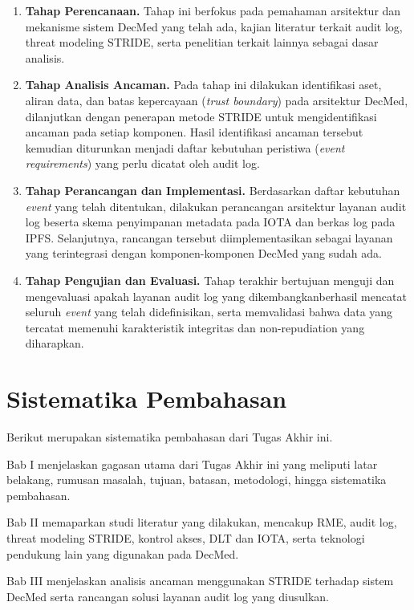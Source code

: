\begin{enumerate}
\item \textbf{Tahap Perencanaan.} Tahap ini berfokus pada pemahaman arsitektur dan mekanisme sistem DecMed yang telah ada, kajian literatur terkait audit log, threat modeling STRIDE, serta penelitian terkait lainnya sebagai dasar analisis.

\item \textbf{Tahap Analisis Ancaman.} Pada tahap ini dilakukan identifikasi aset, aliran data, dan batas kepercayaan (\textit{trust boundary}) pada arsitektur DecMed, dilanjutkan dengan penerapan metode STRIDE untuk mengidentifikasi ancaman pada setiap komponen. Hasil identifikasi ancaman tersebut kemudian diturunkan menjadi daftar kebutuhan peristiwa (\textit{event requirements}) yang perlu dicatat oleh audit log.

\item \textbf{Tahap Perancangan dan Implementasi.} Berdasarkan daftar
kebutuhan \textit{event} yang telah ditentukan, dilakukan perancangan
arsitektur layanan audit log beserta skema penyimpanan metadata pada
IOTA dan berkas log pada IPFS. Selanjutnya, rancangan tersebut diimplementasikan sebagai layanan yang terintegrasi dengan komponen-komponen DecMed yang sudah ada.

\item \textbf{Tahap Pengujian dan Evaluasi.} Tahap terakhir bertujuan
menguji dan mengevaluasi apakah layanan audit log yang dikembangkanberhasil mencatat seluruh \textit{event} yang telah didefinisikan, serta memvalidasi bahwa data yang tercatat memenuhi karakteristik integritas dan non-repudiation yang diharapkan.
\end{enumerate}

\section{Sistematika Pembahasan}
\label{sec:sistematika}

Berikut merupakan sistematika pembahasan dari Tugas Akhir ini.

Bab I menjelaskan gagasan utama dari Tugas Akhir ini yang meliputi latar belakang, rumusan masalah, tujuan, batasan, metodologi, hingga sistematika pembahasan.

Bab II memaparkan studi literatur yang dilakukan, mencakup RME, audit log, threat modeling STRIDE, kontrol akses, DLT dan IOTA, serta teknologi pendukung lain yang digunakan pada DecMed.

Bab III menjelaskan analisis ancaman menggunakan STRIDE terhadap sistem
DecMed serta rancangan solusi layanan audit log yang diusulkan.

